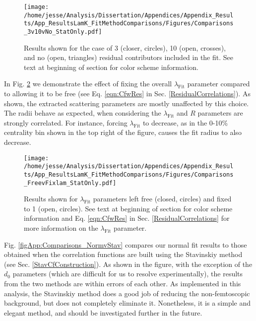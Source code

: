 \documentclass[/home/jesse/Analysis/FemtoAnalysis/AnalysisNotes/AnalysisNoteJBuxton.tex]{subfiles}
\begin{document}
\begin{figure}[h]
  \centering
  \texttt{[image: /home/jesse/Analysis/Dissertation/Appendices/Appendix\_Results/App\_ResultsLamK\_FitMethodComparisons/Figures/Comparisons\_3v10vNo\_StatOnly.pdf]}
  \caption[Fit comparison: number of residuals]
  {
  Results shown for the case of 3 (closer, circles), 10 (open, crosses), and no (open, triangles) residual contributors included in the fit.
  See text at beginning of section for color scheme information.
  }
  \label{figApp:Comparisons_3v10vNo}
\end{figure}


In Fig. \ref{figApp:Comparisons_FreevFixlam} we demonstrate the effect of fixing the overall $\lambda_{\mathrm{Fit}}$ parameter compared to allowing it to be free (see Eq. \ref{eqn:CfwRes} in Sec. \ref{ResidualCorrelations}).
As shown, the extracted scattering parameters are mostly unaffected by this choice.
The radii behave as expected, when considering the $\lambda_{\mathrm{Fit}}$ and $R$ parameters are strongly correlated.
For instance, forcing $\lambda_{\mathrm{Fit}}$ to decrease, as in the 0-10\% centrality bin shown in the top right of the figure, causes the fit radius to also decrease.

\begin{figure}[h]
  \centering
  \texttt{[image: /home/jesse/Analysis/Dissertation/Appendices/Appendix\_Results/App\_ResultsLamK\_FitMethodComparisons/Figures/Comparisons\_FreevFixlam\_StatOnly.pdf]}
  \caption[Fit comparison: free vs fixed $\lambda_{\mathrm{Fit}}$]
  {
  Results shown for $\lambda_{\mathrm{Fit}}$ parameters left free (closed, circles) and fixed to 1 (open, circles).
  See text at beginning of section for color scheme information and Eq. \ref{eqn:CfwRes} in Sec. \ref{ResidualCorrelations} for more information on the $\lambda_{\mathrm{Fit}}$ parameter.
  }
  \label{figApp:Comparisons_FreevFixlam}
\end{figure}



Fig. \ref{figApp:Comparisons_NormvStav} compares our normal fit results to those obtained when the correlation functions are built using the Stavinskiy method (see Sec. \ref{StavCfConstruction}).
As shown in the figure, with the exception of the $d_{0}$ parameters (which are difficult for us to resolve experimentally), the results from the two methods are within errors of each other.
As implemented in this analysis, the Stavinskiy method does a good job of reducing the non-femtoscopic background, but does not completely eliminate it.
Nonetheless, it is a simple and elegant method, and should be investigated further in the future.
\end{document}
